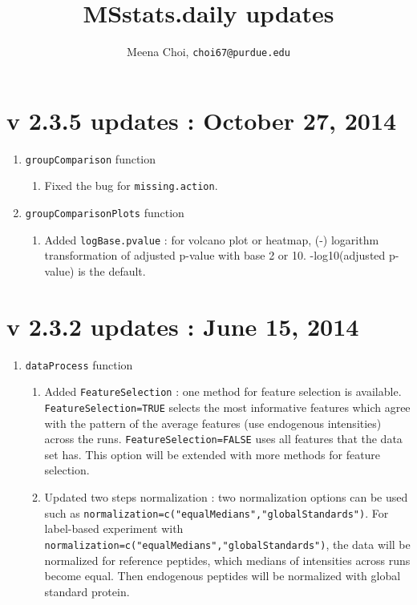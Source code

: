\documentclass[10pt]{article}
\begin{document}
\noindent

\title{MSstats.daily updates}
\author{Meena Choi, {\tt choi67@purdue.edu}}
\maketitle


\section*{v 2.3.5 updates : October 27, 2014}
\begin{enumerate}
\item {\tt groupComparison} function
	\begin{enumerate}
	\item Fixed the bug for {\tt missing.action}.
	\end{enumerate}
	
\item {\tt groupComparisonPlots} function
	\begin{enumerate}
	\item Added {\tt logBase.pvalue} : for volcano plot or heatmap, (-) logarithm transformation of adjusted p-value with base 2 or 10. -log10(adjusted p-value) is the default.
	\end{enumerate}
\end{enumerate}


\section*{v 2.3.2 updates : June 15, 2014}
\begin{enumerate}
\item {\tt dataProcess} function
	\begin{enumerate}
	\item Added {\tt FeatureSelection} : one method for feature selection is available. {\tt FeatureSelection=TRUE} selects the most informative features which agree with the pattern of the average features (use endogenous intensities) across the runs. {\tt FeatureSelection=FALSE} uses all features that the data set has. This option will be extended with more methods for feature selection.
	\item Updated two steps normalization : two normalization options can be used such as {\tt normalization=c("equalMedians","globalStandards")}. For label-based experiment with {\tt normalization=c("equalMedians","globalStandards")}, the data will be normalized for reference peptides, which medians of intensities across runs become equal. Then endogenous peptides will be normalized with global standard protein.
	\end{enumerate}
\end{enumerate}
\end{document}
